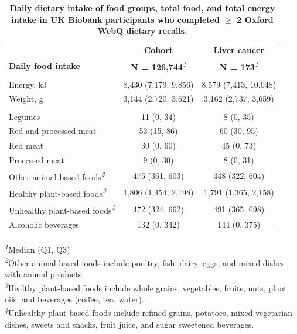 \documentclass[
]{article}
\begin{document}
\begin{table}[h]
\caption{\label{tab:diet}\textbf{Daily dietary intake of food groups, total food, and total energy intake in UK Biobank participants who completed \(\geq\) 2 Oxford WebQ dietary recalls.}} 
\fontsize{9.0pt}{10.8pt}\selectfont
\begin{tabular*}{1\linewidth}{@{\extracolsep{\fill}}lcc}
\toprule
 & \textbf{Cohort} & \textbf{Liver cancer} \\ 
\cmidrule(lr){2-2} \cmidrule(lr){3-3}
\textbf{Daily food intake} & \textbf{N = 126,744}\textsuperscript{\textit{1}} & \textbf{N = 173}\textsuperscript{\textit{1}} \\ 
\midrule\addlinespace[2.5pt]
\multicolumn{3}{l}{{\bfseries Total food intake}} \\ 
\midrule\addlinespace[2.5pt]
Energy, kJ & 8,430 (7,179, 9,856) & 8,579 (7,413, 10,048) \\ 
Weight, g & 3,144 (2,720, 3,621) & 3,162 (2,737, 3,659) \\ 
\midrule\addlinespace[2.5pt]
\multicolumn{3}{l}{{\bfseries Food groups, g/day}} \\ 
\midrule\addlinespace[2.5pt]
Legumes & 11 (0, 34) & 8 (0, 35) \\ 
Red and processed meat & 53 (15, 86) & 60 (30, 95) \\ 
Red meat & 30 (0, 60) & 45 (0, 73) \\ 
Processed meat & 9 (0, 30) & 8 (0, 31) \\ 
Other animal-based foods\textsuperscript{\textit{2}} & 475 (361, 603) & 448 (322, 604) \\ 
Healthy plant-based foods\textsuperscript{\textit{3}} & 1,806 (1,454, 2,198) & 1,791 (1,365, 2,158) \\ 
Unhealthy plant-based foods\textsuperscript{\textit{4}} & 472 (324, 662) & 491 (365, 698) \\ 
Alcoholic beverages & 132 (0, 342) & 144 (0, 375) \\ 
\bottomrule
\end{tabular*}
\begin{minipage}{\linewidth}
\textsuperscript{\textit{1}}Median (Q1, Q3)\\
\textsuperscript{\textit{2}}Other animal-based foods include poultry, fish, dairy, eggs, and mixed dishes with animal products.\\
\textsuperscript{\textit{3}}Healthy plant-based foods include whole grains, vegetables, fruits, nuts, plant oils, and beverages (coffee, tea, water).\\
\textsuperscript{\textit{4}}Unhealthy plant-based foods include refined grains, potatoes, mixed vegetarian dishes, sweets and snacks, fruit juice, and sugar sweetened beverages.\\
\end{minipage}
\end{table}
\end{document}
